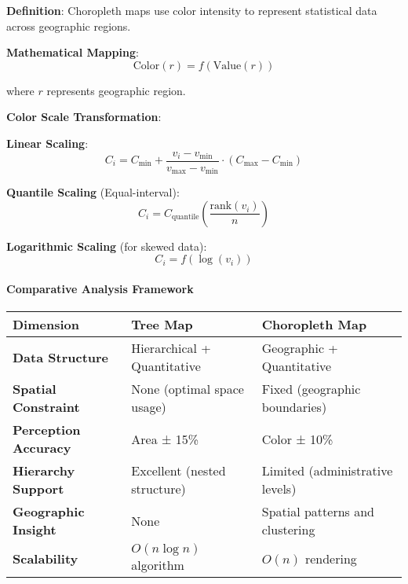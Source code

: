 \documentclass[11pt]{article}
\begin{document}
\textbf{Definition}: Choropleth maps use color intensity to represent
statistical data across geographic regions.

\textbf{Mathematical Mapping}: \[\text{Color}(r) = f(\text{Value}(r))\]

where \(r\) represents geographic region.

\textbf{Color Scale Transformation}:

\textbf{Linear Scaling}:
\[C_i = C_{\min} + \frac{v_i - v_{\min}}{v_{\max} - v_{\min}} \cdot (C_{\max} - C_{\min})\]

\textbf{Quantile Scaling} (Equal-interval):
\[C_i = C_{\text{quantile}}\left(\frac{\text{rank}(v_i)}{n}\right)\]

\textbf{Logarithmic Scaling} (for skewed data): \[C_i = f(\log(v_i))\]

\paragraph{Comparative Analysis
Framework}\label{comparative-analysis-framework}

\begin{longtable}[]{@{}
  >{\raggedright\arraybackslash}p{}
  >{\raggedright\arraybackslash}p{}
  >{\raggedright\arraybackslash}p{}@{}}
\toprule\noalign{}
\begin{minipage}[b]{\linewidth}\raggedright
\textbf{Dimension}
\end{minipage} & \begin{minipage}[b]{\linewidth}\raggedright
\textbf{Tree Map}
\end{minipage} & \begin{minipage}[b]{\linewidth}\raggedright
\textbf{Choropleth Map}
\end{minipage} \\
\midrule\noalign{}
\endhead
\bottomrule\noalign{}
\endlastfoot
\textbf{Data Structure} & Hierarchical + Quantitative & Geographic +
Quantitative \\
\textbf{Spatial Constraint} & None (optimal space usage) & Fixed
(geographic boundaries) \\
\textbf{Perception Accuracy} & Area ± 15\% & Color ± 10\% \\
\textbf{Hierarchy Support} & Excellent (nested structure) & Limited
(administrative levels) \\
\textbf{Geographic Insight} & None & Spatial patterns and clustering \\
\textbf{Scalability} & \(O(n \log n)\) algorithm & \(O(n)\) rendering \\
\end{longtable}
\end{document}
